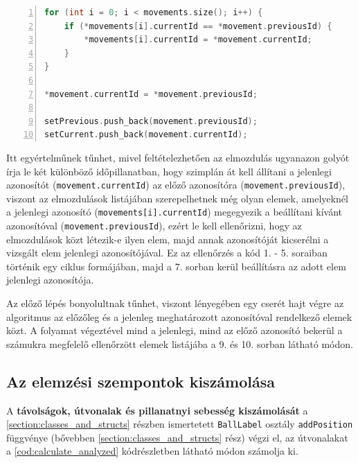\begin{codewrapper}
\begin{lstlisting}[language=C++, numbers=left, caption={A piros golyók azonosítójának beállítása.}, label={cod:red_ball_set_switch}]
for (int i = 0; i < movements.size(); i++) {
    if (*movements[i].currentId == *movement.previousId) {
        *movements[i].currentId = *movement.currentId;
    }
}

*movement.currentId = *movement.previousId;

setPrevious.push_back(movement.previousId);
setCurrent.push_back(movement.currentId);
\end{lstlisting}
\end{codewrapper}

\par Itt egyértelműnek tűnhet, mivel feltételezhetően az elmozdulás ugyanazon golyót írja le két különböző időpillanatban, hogy szimplán át kell állítani a jelenlegi azonosítót (\lstinline{movement.currentId}) az előző azonosítóra (\lstinline{movement.previousId}), viszont az elmozdulások listájában szerepelhetnek még olyan elemek, amelyeknél a jelenlegi azonosító (\lstinline{movements[i].currentId}) megegyezik a beállítani kívánt azonosítóval (\lstinline{movement.previousId}), ezért le kell ellenőrizni, hogy az elmozdulások közt létezik-e ilyen elem, majd annak azonosítóját kicserélni a vizsgált elem jelenlegi azonosítójával. Ez az ellenőrzés a kód 1. - 5. soraiban történik egy ciklus formájában, majd a 7. sorban kerül beállításra az adott elem jelenlegi azonosítója.
\par Az előző lépés bonyolultnak tűnhet, viszont lényegében egy cserét hajt végre az algoritmus az előzőleg és a jelenleg meghatározott azonosítóval rendelkező elemek közt. A folyamat végeztével mind a jelenlegi, mind az előző azonosító bekerül a számukra megfelelő ellenőrzött elemek listájába a 9. és 10. sorban látható módon.

\subsection{Az elemzési szempontok kiszámolása}
A \textbf{távolságok, útvonalak és pillanatnyi sebesség kiszámolását} a \ref{section:classes_and_structs} részben ismertetett \lstinline{BallLabel} osztály \lstinline{addPosition} függvénye (bővebben \ref{section:classes_and_structs} rész) végzi el, az útvonalakat a \ref{cod:calculate_analyzed} kódrészletben látható módon számolja ki.

